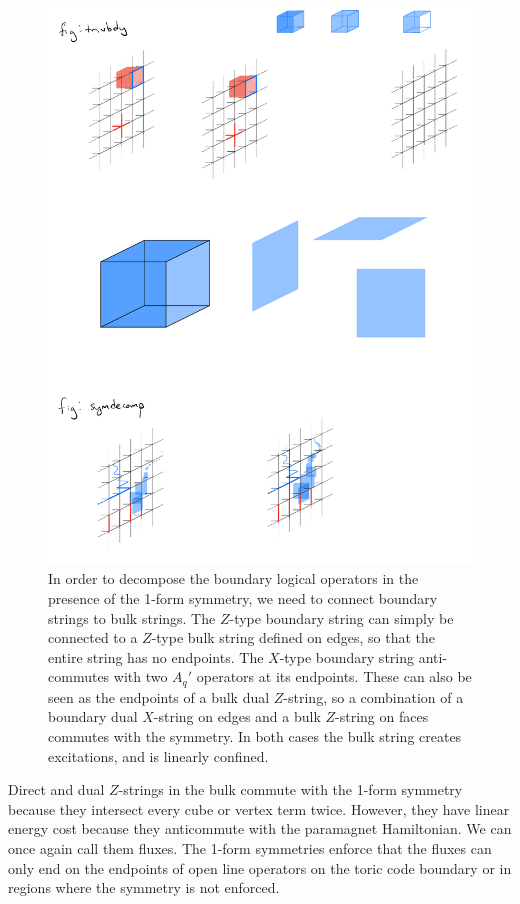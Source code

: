 \documentclass[twocolumn, longbibliography]{revtex4-2}
\begin{document}
\begin{figure}
\centering
\includegraphics{symdecomp}
\caption{In order to decompose the boundary logical operators in the presence of the 1-form symmetry, we need to connect boundary strings to bulk strings. The $Z$-type boundary string can simply be connected to a $Z$-type bulk string defined on edges, so that the entire string has no endpoints. The $X$-type boundary string anti-commutes with two $A_q'$ operators at its endpoints. These can also be seen as the endpoints of a bulk dual $Z$-string, so a combination of a boundary dual $X$-string on edges and a bulk $Z$-string on faces commutes with the symmetry. In both cases the bulk string creates excitations, and is linearly confined.}
\label{fig:symdecomp}
\end{figure}

Direct and dual $Z$-strings in the bulk commute with the 1-form symmetry because they intersect every cube or vertex term twice. However, they have linear energy cost because they anticommute with the paramagnet Hamiltonian. We can once again call them fluxes. The 1-form symmetries enforce that the fluxes can only end on the endpoints of open line operators on the toric code boundary or in regions where the symmetry is not enforced.
\end{document}
